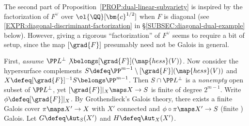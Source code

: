 \documentclass[12pt]{report}
\begin{document}

The second part of Proposition~\ref{PROP:dual-linear-subvariety} is inspired by
the factorization of $F^\vee$ over $\ol{\QQ}[\bm{c}^{1/2}]$ when $F$ is diagonal (see \eqref{EXPR:diagonal-discriminant-factorization} in \S\ref{SUBSEC:diagonal-dual-example} below).
However,
giving a rigorous ``factorization'' of $F^\vee$ seems to require a bit of setup,
since the map $[\grad{F}]$ presumably need not be Galois in general.

First,
\emph{assume} $\PP L^\perp \not\belongs [\grad{F}](\map{hess}(V))$.
Now consider the hypersurface complements $S\defeq \PP^{m-1}\setminus [\grad{F}](\map{hess}(V))$ and $X\defeq [\grad{F}]^{-1}S\belongs \PP^{m-1}$.
Then $S\cap\PP L^\perp$ is a \emph{nonempty} open subset of $\PP L^\perp$,
yet $[\grad{F}]\vert_X\maps X\to S$ is finite \emph{\etale} of degree $2^{m-1}$.
Write $\phi\defeq [\grad{F}]\vert_X$.
By Grothendieck's Galois theory,
there exists a finite \etale Galois cover $\pi\maps X'\to X$ with $X'$ connected and $\phi\circ\pi\maps X'\to S$ (finite \etale) Galois.
Let $G\defeq\Aut_S(X')$ and $H\defeq\Aut_X(X')$.
\end{document}
